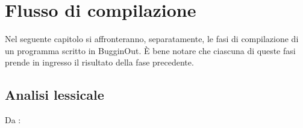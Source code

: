 
\chapter{Flusso di compilazione}
\label{chap:flusso-di-compilazione}

Nel seguente capitolo si affronteranno, separatamente, le fasi di compilazione di un programma scritto in BugginOut. \`E bene notare che ciascuna di queste fasi prende in ingresso il risultato della fase precedente.

\section{Analisi lessicale}
\label{sec:analisi-lessicale}

Da \cite{alfred2007compilers}:
